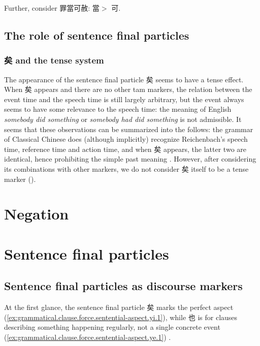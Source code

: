 \documentclass[UTF8, a4paper, oneside, scheme=plain, 12pt]{ctexrep}
\newcommand*{\textgt}{$>$ }
\newcommand*{\citepages}[1]{pp.~{#1}}
\newcommand{\form}[1]{\emph{#1}}
\begin{document}
Further, consider 罪當可赦: 當\textgt 可.

\section{The role of sentence final particles}\label{sec:tam.sfp}

\subsection{矣 and the tense system}\label{sec:tam.sfp.yi}

The appearance of the sentence final particle 矣 seems to have a tense effect.
When 矣 appears and there are no other \ac{tam} markers, the relation between the event time and the speech time is still largely arbitrary,
but the event always seems to have some relevance to the speech time:
the meaning of English \form{somebody did something} or \form{somebody had did something} is not admissible.
It seems that these observations can be summarized into the follows:
the grammar of Classical Chinese does (although implicitly) recognize Reichenbach's speech time, reference time and action time,
and when 矣 appears, the latter two are identical, hence prohibiting the simple past meaning
 \citep[\citepages{437-446}]{meiguang2018}.
However, after considering its combinations with other markers, we do not consider 矣 itself to be a tense marker ().

\chapter{Negation}

\chapter{Sentence final particles}

\section{Sentence final particles as discourse markers}

At the first glance, the sentence final particle 矣 marks the perfect aspect
(\ref{ex:grammatical.clause.force.sentential-aspect.yi.1}),
while 也 is for clauses describing something happening regularly, not a single concrete event (\ref{ex:grammatical.clause.force.sentential-aspect.ye.1})
\citep[\citepages{443-445}]{meiguang2018}.
\end{document}
